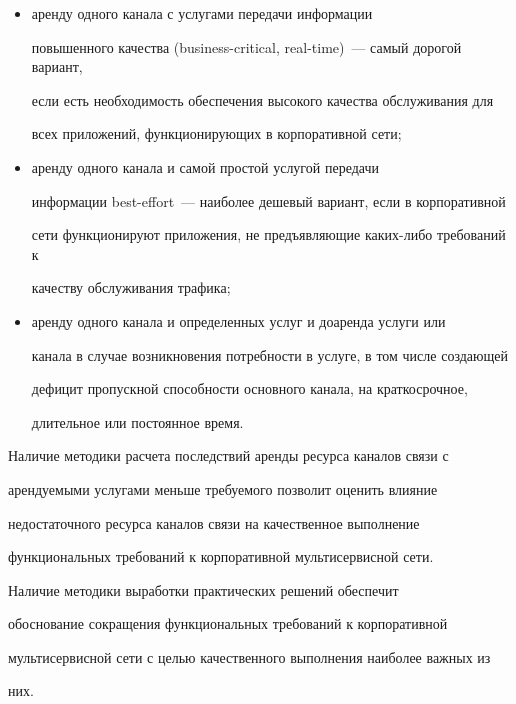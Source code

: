       \begin{itemize}


      \item аренду одного канала с услугами передачи информации 


повышенного качества (business-critical, real-time)~--- самый дорогой вариант, 


если есть не\-об\-хо\-ди\-мость обеспечения высокого качества обслуживания для 


всех приложений, функционирующих в корпоративной сети;


      \item аренду одного канала и самой простой услугой передачи 


информации best-effort~--- наиболее дешевый вариант, если в корпоративной 


сети функционируют приложения, не предъявляющие каких-либо требований к 


качеству обслуживания трафика;


      \item аренду одного канала и определенных услуг и доаренда услуги или 


канала в случае возникновения потребности в услуге, в том числе создающей 


дефицит пропускной способности основного канала, на краткосрочное, 


длительное или постоянное время.


      \end{itemize}


      


     Наличие методики расчета последствий аренды ресурса каналов связи с 


арендуемыми услугами меньше требуемого позволит оценить влияние 


недостаточного ресурса каналов связи на качественное выполнение 


функциональных требований к корпоративной мультисервисной сети.


     


     Наличие методики выработки практических решений обеспечит 


обоснование сокращения функциональных требований к корпоративной 


мультисервисной сети с целью качественного выполнения наиболее важных из 


них.


